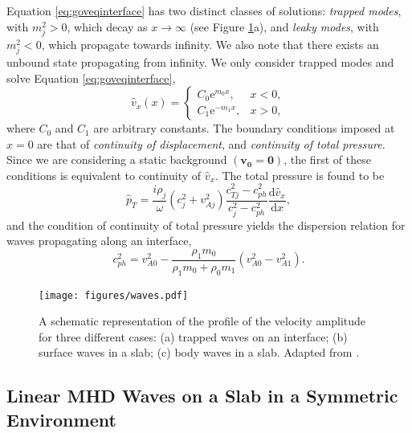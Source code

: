 Equation \eqref{eq:goveqinterface} has two distinct classes of solutions: \emph{trapped modes}, with $m_j^2 > 0$, which decay as $x \to \infty$ (see Figure \ref{fig:waves}a), and \emph{leaky modes}, with $m_j^2 < 0$, which propagate towards infinity.
We also note that there exists an unbound state propagating from infinity.
We only consider trapped modes and solve Equation \eqref{eq:goveqinterface},
%
\begin{equation}
\label{eq:vxinterface}
\hat{v}_x (x) = 
\begin{cases}
C_0 \mathrm{e}^{m_0 x}, & x < 0,
\\
C_1 \mathrm{e}^{- m_1 x}, & x > 0,
\end{cases}
\end{equation}
%
where $C_0$ and $C_1$ are arbitrary constants.
The boundary conditions imposed at $x=0$ are that of \emph{continuity of displacement}, and \emph{continuity of total pressure}.
Since we are considering a static background $(\mathbf{v_0} = \mathbf{0})$, the first of these conditions is equivalent to continuity of $\hat{v}_x$.
The total pressure is found to be
%
\begin{equation}
\label{eq:pT}
\hat p_T = \frac{i \rho_j}{\omega} (c_j^2 + v_{A j}^2) \frac{c_{T j}^2 - c_{ph}^2}{c_j^2 - c_{ph}^2} \frac{\mathrm{d} \hat{v}_x}{\mathrm{d} x},
\end{equation}
%
and the condition of continuity of total pressure yields the dispersion relation for waves propagating along an interface,
%
\begin{equation}
\label{eq:disprelint}
c_{ph}^2 = v_{A 0}^2 - \frac{\rho_1 m_0}{\rho_1 m_0 + \rho_0 m_1} ( v_{A 0}^2 - v_{A 1}^2 ).
\end{equation}
%

\begin{figure}[t]
\centering
\texttt{[image: figures/waves.pdf]}
\caption{A schematic representation of the profile of the velocity amplitude for three different cases: (a) trapped waves on an interface; (b) surface waves in a slab; (c) body waves in a slab. Adapted from \cite{Priest2014}.
}
\label{fig:waves}
\end{figure}

\subsection{Linear MHD Waves on a Slab in a Symmetric Environment}
\label{subsec:linearmhdslab}

